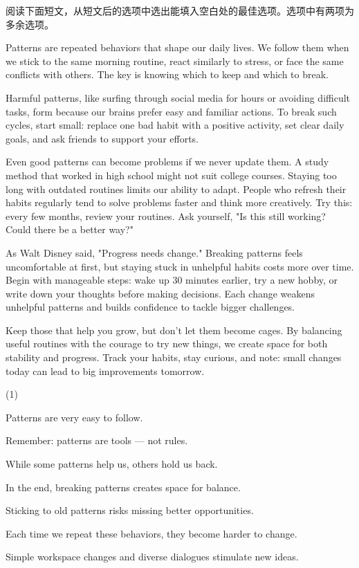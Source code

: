 \documentclass{英语试卷}
\begin{document}
\par 阅读下面短文，从短文后的选项中选出能填入空白处的最佳选项。选项中有两项为多余选项。\par
\par Patterns are repeated behaviors that shape our daily lives. We follow them when we stick to the same morning routine, react similarly to stress, or face the same conflicts with others.  The key is knowing which to keep and which to break.\par
\par Harmful patterns, like surfing through social media for hours or avoiding difficult tasks, form because our brains prefer easy and familiar actions.  To break such cycles, start small: replace one bad habit with a positive activity, set clear daily goals, and ask friends to support your efforts.\par
\par Even good patterns can become problems if we never update them. A study method that worked in high school might not suit college courses. Staying too long with outdated routines limits our ability to adapt.  People who refresh their habits regularly tend to solve problems faster and think more creatively. Try this: every few months, review your routines. Ask yourself, "Is this still working? Could there be a better way?" \par
\par As Walt Disney said, "Progress needs change." Breaking patterns feels uncomfortable at first, but staying stuck in unhelpful habits costs more over time. Begin with manageable steps: wake up 30 minutes earlier, try a new hobby, or write down your thoughts before making decisions. Each change weakens unhelpful patterns and builds confidence to tackle bigger challenges.\par
\par {} Keep those that help you grow, but don't let them become cages. By balancing useful routines with the courage to try new things, we create space for both stability and progress. Track your habits, stay curious, and note: small changes today can lead to big improvements tomorrow.\par
\begin{choices}(1)
  \item Patterns are very easy to follow.
  \item Remember: patterns are tools — not rules.
  \item While some patterns help us, others hold us back.
  \item In the end, breaking patterns creates space for balance.
  \item Sticking to old patterns risks missing better opportunities.
  \item Each time we repeat these behaviors, they become harder to change.
  \item Simple workspace changes and diverse dialogues stimulate new ideas.
\end{choices}
\end{document}
